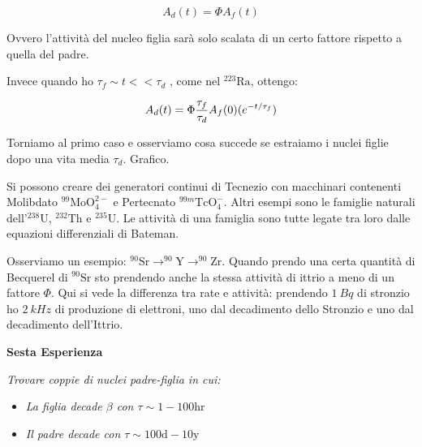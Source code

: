\begin{equation}
A_d(t)=\Phi A_f(t)
\end{equation}

Ovvero l'attività del nucleo figlia sarà solo scalata di un certo fattore rispetto a quella del padre.

Invece quando ho $\tau_f \sim t << \tau_d$ , come nel $^{223}\text{Ra}$, ottengo:

\begin{equation}
A_d(t)=\Phi \frac{\tau_f}{\tau_d}A_f(0)(\-e^{-t/\tau_f})
\end{equation}

Torniamo al primo caso e osserviamo cosa succede se estraiamo i nuclei figlie dopo una vita media $\tau_d$. Grafico.

Si possono creare dei generatori continui di Tecnezio con macchinari contenenti Molibdato $^{99}\text{MoO}_4^{2-}$ e Pertecnato $^{99m}\text{TcO}_4^-$.
Altri esempi sono le famiglie naturali dell'$^{238}\text{U}$, $^{232}\text{Th}$ e $^{235}\text{U}$.  Le attività di una famiglia sono tutte legate tra loro dalle equazioni differenziali di Bateman.

Osserviamo un esempio: $^{90}\text{Sr} \rightarrow ^{90}\text{Y} \rightarrow ^{90}\text{Zr}$. Quando prendo una certa quantità di Becquerel di $^{90}\text{Sr}$ sto prendendo anche la stessa attività di ittrio a meno di un fattore $\Phi$. Qui si vede la differenza tra rate e attività: prendendo $1 \ Bq$ di stronzio ho $2 \ kHz$ di produzione di elettroni, uno dal decadimento dello Stronzio e uno dal decadimento dell'Ittrio. 

\textbf{Sesta Esperienza}

\emph{Trovare coppie di nuclei padre-figlia in cui:}
\begin{itemize}
\item \emph{La figlia decade $\beta$ con $\tau\sim1-100\text{hr}$}
\item \emph{Il padre decade con $\tau\sim100\text{d}-10\text{y}$}
\end{itemize}


